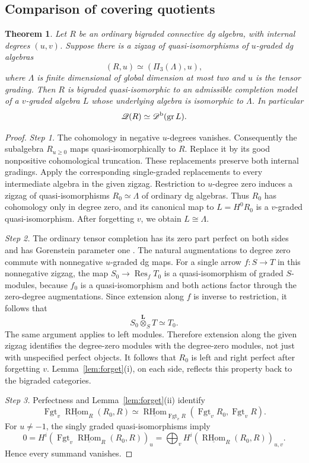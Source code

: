 \documentclass[12pt,a4paper,english,reqno]{amsart}
\theoremstyle{plain}
\newtheorem{thm}{Theorem}[section]
\theoremstyle{definition}
\numberwithin{equation}{section}
\newcommand{\lemref}[1]{Lemma~\ref{#1}}
\def\La{\Lambda}
\def\Db{{\mathcal D}^{\text{\rm b}}}
\def\iso{\cong}
\def\Lox{\overset{\mathbf{L}}{\otimes}}
\def\Ds{\bigoplus}
\newcommand{\Fgt}{\operatorname{Fgt}}
\def\RHom{\operatorname{RHom}}
\def\gr{\operatorname{gr}}
\newcommand{\uRHom}{\underline{\RHom}}
\begin{document}
\subsection{Comparison of covering quotients}
\begin{thm}\label{thm:automatic}
Let $R$ be an ordinary bigraded connective dg algebra, with internal degrees $(u,v)$. Suppose there is a zigzag of quasi-isomorphisms of $u$-graded dg algebras
\[
 (R,u)\simeq(\Pi_3(\La),u),
\]
where $\La$ is finite dimensional of global dimension at most two and $u$ is the tensor grading. Then $R$ is bigraded quasi-isomorphic to an admissible completion model of a $v$-graded algebra $L$ whose underlying algebra is isomorphic to $\La$. In particular
\[
 \mathcal Q(R)\simeq\Db(\gr L).
\]
\end{thm}
\begin{proof}
\emph{Step 1.}
The cohomology in negative $u$-degrees vanishes. Consequently the subalgebra $R_{u\ge0}$ maps quasi-isomorphically to $R$. Replace it by its good nonpositive cohomological truncation. These replacements preserve both internal gradings. Apply the corresponding single-graded replacements to every intermediate algebra in the given zigzag. Restriction to $u$-degree zero induces a zigzag of quasi-isomorphisms
$R_0\simeq\La$ of ordinary dg algebras. Thus $R_0$ has cohomology only in degree zero, and its canonical map to $L=H^0R_0$ is a $v$-graded quasi-isomorphism. After forgetting $v$, we obtain $L\iso\La$.

\medskip\noindent\emph{Step 2.}
The ordinary tensor completion has its zero part perfect on both sides and has Gorenstein parameter one \cite[Example A.12(2)]{Han}. The natural augmentations to degree zero commute with nonnegative $u$-graded dg maps. For a single arrow $f:S\to T$ in this nonnegative zigzag, the map $S_0\to\operatorname{Res}_fT_0$ is a quasi-isomorphism of graded $S$-modules, because $f_0$ is a quasi-isomorphism and both actions factor through the zero-degree augmentations. Since extension along $f$ is inverse to restriction, it follows that
\[
 S_0\Lox_S T\simeq T_0.
\]
The same argument applies to left modules. Therefore extension along the given zigzag identifies the degree-zero modules with the degree-zero modules, not just with unspecified perfect objects. It follows that $R_0$ is left and right perfect after forgetting $v$. \lemref{lem:forget}(i), on each side, reflects this property back to the bigraded categories.

\medskip\noindent\emph{Step 3.}
Perfectness and \lemref{lem:forget}(ii) identify
\[
 \Fgt_v\uRHom_R(R_0,R)
 \simeq\underline{\RHom}_{\Fgt_vR}(\Fgt_vR_0,\Fgt_vR).
\]
For $u\ne-1$, the singly graded quasi-isomorphisms imply
\[
 0=H^i\!\left(\Fgt_v\uRHom_R(R_0,R)\right)_u
   =\Ds_v H^i\!\left(\uRHom_R(R_0,R)\right)_{u,v}.
\]
Hence every summand vanishes.


\end{proof}
\end{document}
